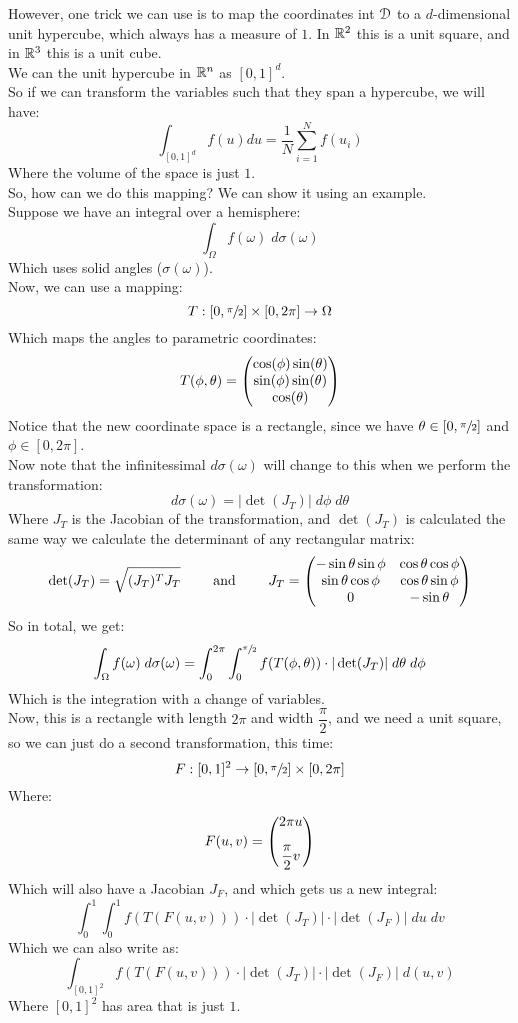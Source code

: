 \documentclass[12pt]{article}
\begin{document}
However, one trick we can use
is to map the coordinates int $\mathcal{D}$
to a $d$-dimensional unit hypercube,
which always has a measure of $1$.
In $\mathbb{R}^2$ this is a unit square,
and in $\mathbb{R}^3$ this is a unit cube. \\
We can the unit hypercube in $\mathbb{R}^n$ 
as $[0, 1]^d$. \\
So if we can transform the variables
such that they span a hypercube,
we will have:
\[ \int_{[0, 1]^d} f(u) du
= \dfrac{1}{N} \sum_{i=1}^N f(u_i)  \]
Where the volume of the space is just $1$. \\

So, how can we do this mapping?
We can show it using an example. \\
Suppose we have an integral over a hemisphere:
\[ \int_\Omega f(\omega) \; d\sigma(\omega) \]
Which uses solid angles ($\sigma(\omega)$). \\
Now, we can use a mapping:
\[ T: [0, \sfrac{\pi}{2}] \times [0, 2\pi] \to \Omega \]
Which maps the angles to parametric coordinates:
\[ T(\phi, \theta) = \begin{pmatrix} 
    \cos(\phi)\sin(\theta) \\
    \sin(\phi)\sin(\theta) \\
    \cos(\theta)
 \end{pmatrix} \]
Notice that the new coordinate space is a rectangle,
since we have $\theta \in [0, \sfrac{\pi}{2}]$
and $\phi \in [0, 2\pi]$. \\
Now note that the infinitessimal $d\sigma(\omega)$
will change to this when we perform the transformation:
\[ d\sigma(\omega) = |\det(J_T)| \; d\phi \; d\theta \]
Where $J_T$ is the Jacobian of the transformation,
and $\det(J_T)$ is calculated the same way
we calculate the determinant of any rectangular
matrix:
\[ \det(J_T) = \sqrt{(J_T)^TJ_T}
\qquad \text{ and } \qquad J_T = \begin{pmatrix} 
-\sin\theta \sin\phi & \cos\theta \cos\phi  \\
\sin\theta \cos\phi  & \cos\theta \sin\phi\\
0 & -\sin\theta  \end{pmatrix} \]
So in total, we get:
\[ \int_\Omega f(\omega) \; d\sigma(\omega)
= \int_0^{2\pi} \int_0^{\sfrac{\pi}{2}} 
f(T(\phi, \theta)) \cdot |\det(J_T)| 
\; d\theta \; d\phi\]
Which is the integration with a change
of variables. \\

Now, this is a rectangle with length $2\pi$
and width $\dfrac{\pi}{2}$,
and we need a unit square,
so we can just do a second transformation,
this time:
\[ F: [0, 1]^2 \to [0, \sfrac{\pi}{2}] \times [0, 2\pi] \]
Where:
\[ F(u, v) = \pmat{2\pi u \vs{10} \\ \dfrac{\pi}{2}v} \]
Which will also have a Jacobian $J_F$,
and which gets us a new integral:
\[ \int_0^{1} \int_0^{1} 
f(T(F(u, v))) \cdot
|\det(J_T)| \cdot
|\det(J_F)| \; du \; dv \]
Which we can also write as:
\[ \int_{[0, 1]^2}
f(T(F(u, v))) \cdot
|\det(J_T)| \cdot
|\det(J_F)| \; d(u, v) \]
Where $[0, 1]^2$
has area that is just $1$. \\
\end{document}
